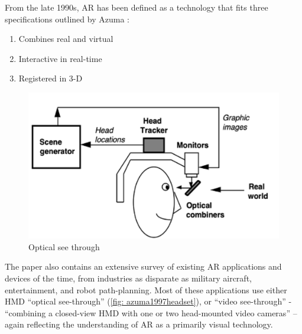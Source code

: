 From the late 1990s, AR has been defined as a technology that fits three specifications outlined by Azuma \citeyearpar{azuma1997}:
\begin{enumerate}
    \item Combines real and virtual
    \item Interactive in real-time
    \item Registered in 3-D
\end{enumerate}
\begin{figure}
    \centering
    \includegraphics{figures/c_5/azuma1997_1.png}
    \caption{Optical see through \citep{azuma1997}}
    \label{fig: azuma1997headset}
\end{figure}
The paper also contains an extensive survey of existing AR applications and devices of the time, from industries as disparate as military aircraft, entertainment, and robot path-planning. Most of these applications use either HMD “optical see-through” (\autoref{fig: azuma1997headset}), or “video see-through” - “combining a closed-view HMD with one or two head-mounted video cameras” – again reflecting the understanding of AR as a primarily visual technology. 

